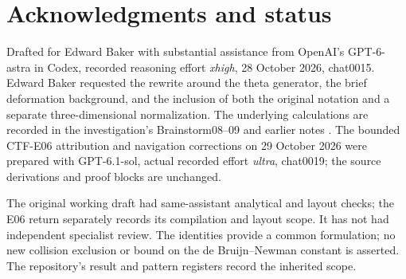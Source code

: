 \documentclass[11pt]{article}
\theoremstyle{remark}
\numberwithin{equation}{section}
\begin{document}
\section*{Acknowledgments and status}

Drafted for Edward Baker with substantial assistance from OpenAI's
GPT-6-astra in Codex, recorded reasoning effort \emph{xhigh},
28 October 2026, chat0015. Edward Baker requested the rewrite around the
theta generator, the brief deformation background, and the inclusion of
both the original notation and a separate three-dimensional normalization.
The underlying calculations are recorded in the investigation's
Brainstorm08--09 and earlier notes \cite{Archive}. The bounded CTF-E06
attribution and navigation corrections on 29 October 2026 were prepared
with GPT-6.1-sol, actual recorded effort \emph{ultra}, chat0019;
the source derivations and proof blocks are unchanged.

The original working draft had same-assistant analytical and layout
checks; the E06 return separately records its compilation and layout
scope. It has not had independent specialist review. The identities
provide a common formulation; no new collision exclusion or bound
on the de Bruijn--Newman constant is asserted. The repository's result
and pattern registers \cite{Results,Patterns} record the inherited scope.
\end{document}
